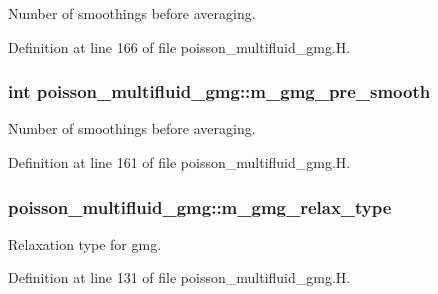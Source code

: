 Number of smoothings before averaging. 



Definition at line 166 of file poisson\+\_\+multifluid\+\_\+gmg.\+H.

\subsubsection[{\texorpdfstring{m\+\_\+gmg\+\_\+pre\+\_\+smooth}{m_gmg_pre_smooth}}]{\setlength{\rightskip}{0pt plus 5cm}int poisson\+\_\+multifluid\+\_\+gmg\+::m\+\_\+gmg\+\_\+pre\+\_\+smooth\hspace{0.3cm}{\ttfamily [protected]}}\hypertarget{classpoisson__multifluid__gmg_ab9c208be2808cdde68c00a2f9013e261}{}\label{classpoisson__multifluid__gmg_ab9c208be2808cdde68c00a2f9013e261}


Number of smoothings before averaging. 



Definition at line 161 of file poisson\+\_\+multifluid\+\_\+gmg.\+H.

\subsubsection[{\texorpdfstring{m\+\_\+gmg\+\_\+relax\+\_\+type}{m_gmg_relax_type}}]{ poisson\+\_\+multifluid\+\_\+gmg\+::m\+\_\+gmg\+\_\+relax\+\_\+type\hspace{0.3cm}{\ttfamily [protected]}}\hypertarget{classpoisson__multifluid__gmg_a768a005e945a1587fbd569dbe0194bc5}{}\label{classpoisson__multifluid__gmg_a768a005e945a1587fbd569dbe0194bc5}


Relaxation type for gmg. 



Definition at line 131 of file poisson\+\_\+multifluid\+\_\+gmg.\+H.

